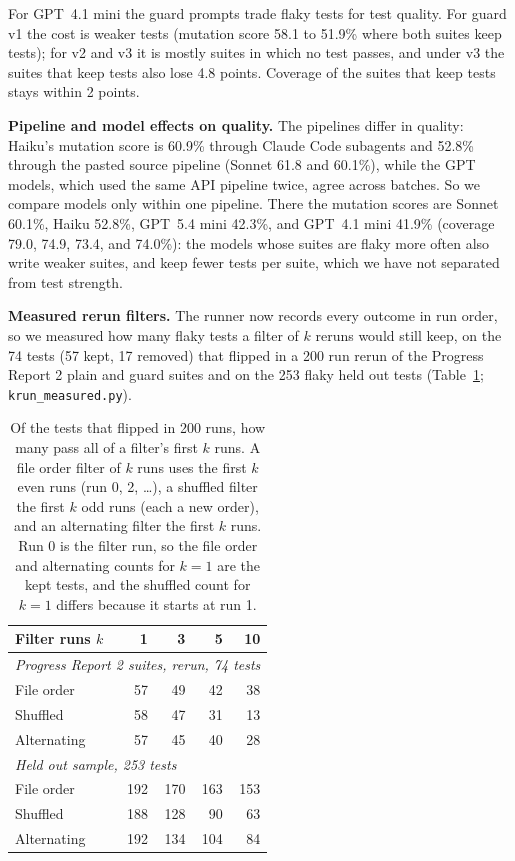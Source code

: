 For GPT~4.1 mini the guard prompts trade flaky tests for test quality. For guard v1 the cost is weaker tests (mutation score 58.1 to 51.9\% where both suites keep tests); for v2 and v3 it is mostly suites in which no test passes, and under v3 the suites that keep tests also lose 4.8 points. Coverage of the suites that keep tests stays within 2 points.

\textbf{Pipeline and model effects on quality.} The pipelines differ in quality: Haiku's mutation score is 60.9\% through Claude Code subagents and 52.8\% through the pasted source pipeline (Sonnet 61.8 and 60.1\%), while the GPT models, which used the same API pipeline twice, agree across batches. So we compare models only within one pipeline. There the mutation scores are Sonnet 60.1\%, Haiku 52.8\%, GPT~5.4 mini 42.3\%, and GPT~4.1 mini 41.9\% (coverage 79.0, 74.9, 73.4, and 74.0\%): the models whose suites are flaky more often also write weaker suites, and keep fewer tests per suite, which we have not separated from test strength.

\textbf{Measured rerun filters.} The runner now records every outcome in run order, so we measured how many flaky tests a filter of $k$ reruns would still keep, on the 74 tests (57 kept, 17 removed) that flipped in a 200 run rerun of the Progress Report 2 plain and guard suites and on the 253 flaky held out tests (Table~\ref{tab:krun}; \texttt{krun\_measured.py}).

\begin{table}[htbp]
\caption{Of the tests that flipped in 200 runs, how many pass all of a filter's first $k$ runs. A file order filter of $k$ runs uses the first $k$ even runs (run 0, 2, \ldots), a shuffled filter the first $k$ odd runs (each a new order), and an alternating filter the first $k$ runs. Run 0 is the filter run, so the file order and alternating counts for $k=1$ are the kept tests, and the shuffled count for $k=1$ differs because it starts at run 1.}
\label{tab:krun}
\small
\begin{tabular}{lrrrr}
\toprule
Filter runs $k$ & 1 & 3 & 5 & 10 \\
\midrule
\multicolumn{5}{l}{\emph{Progress Report 2 suites, rerun, 74 tests}} \\
File order & 57 & 49 & 42 & 38 \\
Shuffled & 58 & 47 & 31 & 13 \\
Alternating & 57 & 45 & 40 & 28 \\
\multicolumn{5}{l}{\emph{Held out sample, 253 tests}} \\
File order & 192 & 170 & 163 & 153 \\
Shuffled & 188 & 128 & 90 & 63 \\
Alternating & 192 & 134 & 104 & 84 \\
\bottomrule
\end{tabular}
\end{table}

